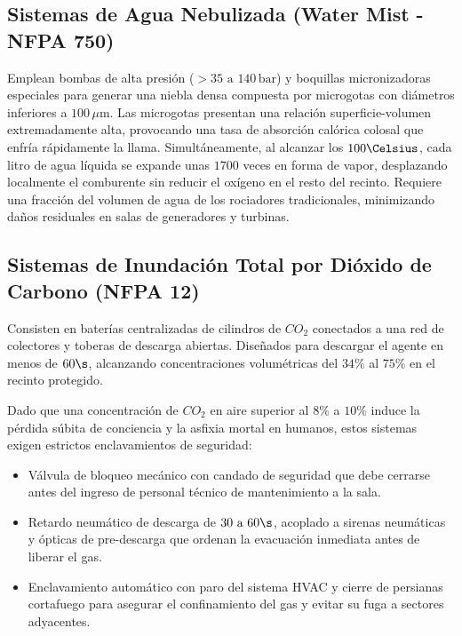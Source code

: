 \subsection{Sistemas de Agua Nebulizada (Water Mist - NFPA 750)}

Emplean bombas de alta presión ($> 35\text{ a }140\,\mathrm{bar}$) y boquillas micronizadoras especiales para generar una
niebla densa compuesta por microgotas con diámetros inferiores a $100\,\mu\mathrm{m}$. Las microgotas presentan una relación
superficie-volumen extremadamente alta, provocando una tasa de absorción calórica colosal que enfría rápidamente la llama.
Simultáneamente, al alcanzar los $100\Celsius$, cada litro de agua líquida se expande unas $1700$ veces en forma de vapor,
desplazando localmente el comburente sin reducir el oxígeno en el resto del recinto. Requiere una fracción del volumen de
agua de los rociadores tradicionales, minimizando daños residuales en salas de generadores y turbinas.

\subsection{Sistemas de Inundación Total por Dióxido de Carbono (NFPA 12)}

Consisten en baterías centralizadas de cilindros de $CO_2$ conectados a una red de colectores y toberas de descarga
abiertas. Diseñados para descargar el agente en menos de $60\s$, alcanzando concentraciones volumétricas del $34\percent$ al
$75\percent$ en el recinto protegido.

Dado que una concentración de $CO_2$ en aire superior al $8\percent$ a $10\percent$ induce la pérdida súbita de conciencia y la
asfixia mortal en humanos, estos sistemas exigen estrictos enclavamientos de seguridad:
\begin{itemize}
    \item Válvula de bloqueo mecánico con candado de seguridad que debe cerrarse antes del ingreso
          de personal técnico de mantenimiento a la sala.
    \item Retardo neumático de descarga de $30\text{ a }60\s$, acoplado a sirenas neumáticas y ópticas de pre-descarga que
          ordenan la evacuación inmediata antes de liberar el gas.
    \item Enclavamiento automático con paro del sistema HVAC y cierre de persianas cortafuego para asegurar el confinamiento
          del gas y evitar su fuga a sectores adyacentes.
\end{itemize}


